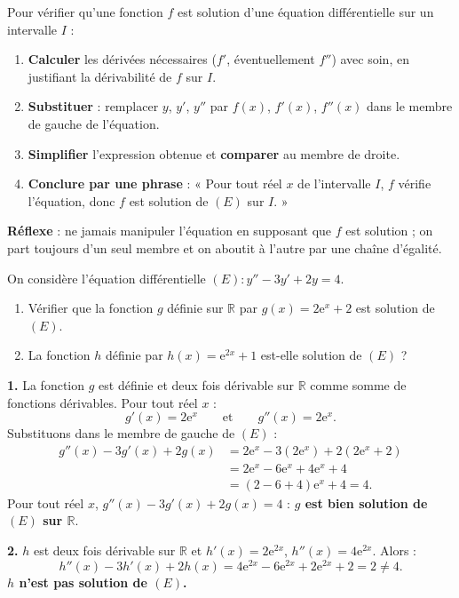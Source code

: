 \documentclass[11pt]{article}
\begin{document}
\begin{methode}
Pour vérifier qu'une fonction $f$ est solution d'une équation différentielle sur un intervalle $I$ :
\begin{enumerate}
\item \textbf{Calculer} les dérivées nécessaires ($f'$, éventuellement $f''$) avec soin, en justifiant la dérivabilité de $f$ sur $I$.
\item \textbf{Substituer} : remplacer $y$, $y'$, $y''$ par $f(x)$, $f'(x)$, $f''(x)$ dans le membre de gauche de l'équation.
\item \textbf{Simplifier} l'expression obtenue et \textbf{comparer} au membre de droite.
\item \textbf{Conclure par une phrase} : « Pour tout réel $x$ de l'intervalle $I$, $f$ vérifie l'équation, donc $f$ est solution de $(E)$ sur $I$. »
\end{enumerate}
\textbf{Réflexe} : ne jamais manipuler l'équation en supposant que $f$ est solution ; on part toujours d'un seul membre et on aboutit à l'autre par une chaîne d'égalité.
\end{methode}

\begin{exoresolu}
On considère l'équation différentielle $(E) : y'' - 3y' + 2y = 4$.
\begin{enumerate}
\item Vérifier que la fonction $g$ définie sur $\mathbb{R}$ par $g(x) = 2\mathrm{e}^{x} + 2$ est solution de $(E)$.
\item La fonction $h$ définie par $h(x) = \mathrm{e}^{2x} + 1$ est-elle solution de $(E)$ ?
\end{enumerate}
\tcblower
\textbf{1.} La fonction $g$ est définie et deux fois dérivable sur $\mathbb{R}$ comme somme de fonctions dérivables. Pour tout réel $x$ :
\[ g'(x) = 2\mathrm{e}^{x} \qquad \text{et} \qquad g''(x) = 2\mathrm{e}^{x}. \]
Substituons dans le membre de gauche de $(E)$ :
\begin{align*}
g''(x) - 3g'(x) + 2g(x) &= 2\mathrm{e}^{x} - 3\left(2\mathrm{e}^{x}\right) + 2\left(2\mathrm{e}^{x} + 2\right) \\
&= 2\mathrm{e}^{x} - 6\mathrm{e}^{x} + 4\mathrm{e}^{x} + 4 \\
&= (2 - 6 + 4)\mathrm{e}^{x} + 4 = 4.
\end{align*}
Pour tout réel $x$, $g''(x) - 3g'(x) + 2g(x) = 4$ : \textbf{$g$ est bien solution de $(E)$ sur $\mathbb{R}$}.

\textbf{2.} $h$ est deux fois dérivable sur $\mathbb{R}$ et $h'(x) = 2\mathrm{e}^{2x}$, $h''(x) = 4\mathrm{e}^{2x}$. Alors :
\[ h''(x) - 3h'(x) + 2h(x) = 4\mathrm{e}^{2x} - 6\mathrm{e}^{2x} + 2\mathrm{e}^{2x} + 2 = 2 \neq 4. \]
\textbf{$h$ n'est pas solution de $(E)$.}
\end{exoresolu}
\end{document}
